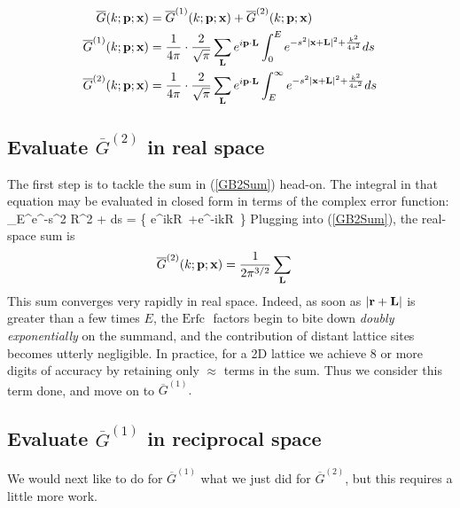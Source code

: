 \documentclass[letterpaper]{article}
\newcommand{\GB}{\overline{G}}
\newcommand{\erfc}{\text{Erfc }}
\begin{document}
\begin{align}
\GB(k; \vb p; \vb x) 
 &= \GB^{(1)}(k; \vb p; \vb x) 
   +\GB^{(2)}(k; \vb p; \vb x) 
\label{GBDecomposition}
\\
\GB^{(1)}(k; \vb p; \vb x) 
&= \frac{1}{4\pi} \cdot \frac{2}{\sqrt{\pi}}
   \sum_{\vb L} e^{i\vb p \cdot \vb L} \int_0^E e^{-s^2 |\vb x+\vb L|^2 + \frac{k^2}{4s^2}} ds
\label{GB1Sum}
\\
\GB^{(2)}(k; \vb p; \vb x) 
&= \frac{1}{4\pi} \cdot \frac{2}{\sqrt{\pi}}
   \sum_{\vb L} e^{i\vb p \cdot \vb L} \int_E^\infty e^{-s^2 |\vb x + \vb L|^2 + \frac{k^2}{4s^2}} ds
\label{GB2Sum}
\end{align}

\subsection*{Evaluate $\GB^{(2)}$ in real space} 

The first step is to tackle the sum in (\ref{GB2Sum}) head-on. 
The integral in that equation may be evaluated in closed form in terms of
the complex error function:
{
 \int_E^\infty e^{-s^2 R^2 + } ds
 = \bigg\{ e^{ikR} \,\erfc{}
                     +e^{-ikR} \,\erfc{}
               \bigg\}
}
Plugging into (\ref{GB2Sum}), the real-space sum is 
\begin{align*}
\GB^{(2)}(k; \vb p; \vb x) 
&= \frac{1}{2\pi^{3/2}}
   \sum_{\vb L}
\end{align*}
This sum converges very rapidly in real space. Indeed, as soon as 
$|\mathbf{r} + \mathbf{L}|$ is greater than a few times $E$, the $\erfc$\!\!
factors begin to bite down \textit{doubly exponentially} on the
summand, and the contribution of distant lattice sites becomes 
utterly negligible. In practice, for a 2D lattice we achieve 8 
or more digits of accuracy by retaining only $\approx$ terms in the sum.
Thus we consider this term done, and move on to $\GB^{(1)}.$ 

\subsection*{Evaluate $\GB^{(1)}$ in reciprocal space} 

We would next like to do for $\GB^{(1)}$ what we just did for $\GB^{(2)}$,
but this requires a little more work. 
\end{document}
